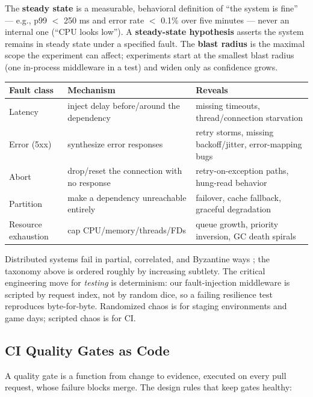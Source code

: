 \begin{definition}
\label{def:chaos}
The \textbf{steady state} is a measurable, behavioral definition of
``the system is fine'' --- e.g., p99 $<$ 250 ms and error rate $<$ 0.1\%
over five minutes --- never an internal one (``CPU looks low''). A
\textbf{steady-state hypothesis} asserts the system remains in steady state
under a specified fault. The \textbf{blast radius} is the maximal scope the
experiment can affect; experiments start at the smallest blast radius (one
in-process middleware in a test) and widen only as confidence grows.
\end{definition}

\begin{center}
\begin{tabularx}{\textwidth}{l X X}
\toprule
\textbf{Fault class} & \textbf{Mechanism} & \textbf{Reveals} \\
\midrule
Latency & inject delay before/around the dependency & missing timeouts, thread/connection starvation \\
Error (5xx) & synthesize error responses & retry storms, missing backoff/jitter, error-mapping bugs \\
Abort & drop/reset the connection with no response & retry-on-exception paths, hung-read behavior \\
Partition & make a dependency unreachable entirely & failover, cache fallback, graceful degradation \\
Resource exhaustion & cap CPU/memory/threads/FDs & queue growth, priority inversion, GC death spirals \\
\bottomrule
\end{tabularx}
\end{center}

Distributed systems fail in partial, correlated, and Byzantine ways
\cite{kleppmann2017ddia}; the taxonomy above is ordered roughly by
increasing subtlety. The critical engineering move for \emph{testing} is
determinism: our fault-injection middleware is scripted by request index,
not by random dice, so a failing resilience test reproduces byte-for-byte.
Randomized chaos is for staging environments and game days; scripted chaos
is for CI.

\subsection{CI Quality Gates as Code}
\label{sec:ch19-gates}

A quality gate is a function from change to evidence, executed on every
pull request, whose failure blocks merge. The design rules that keep gates
healthy:

